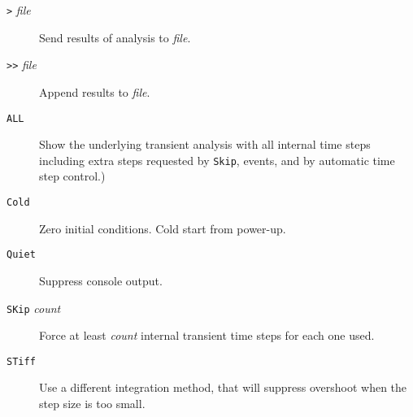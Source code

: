 \begin{description}


\item[{\tt >} {\it file}] Send results of analysis to {\it file}.

\item[{\tt >>} {\it file}] Append results to {\it file}.



\item[{\tt ALL}] Show the underlying transient analysis with all
internal time steps including extra steps requested by {\tt Skip},
events, and by automatic time step control.)

\item[{\tt Cold}] Zero initial conditions.  Cold start from power-up.






\item[{\tt Quiet}] Suppress console output.

\item[{\tt SKip} {\it count}] Force at least {\it count} internal
transient time steps for each one used.

\item[{\tt STiff}] Use a different integration method,
that will suppress overshoot when the step size is too
small.


\end{description}
